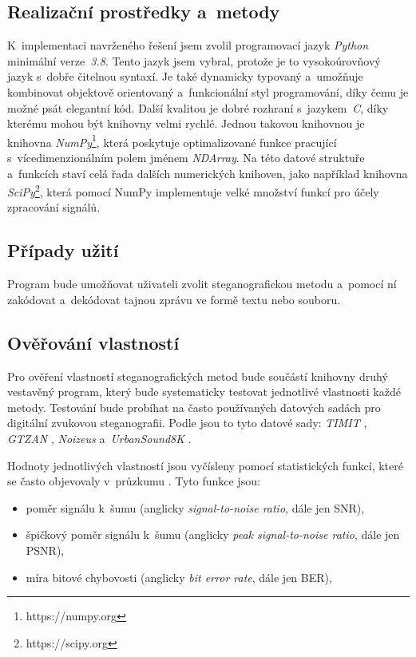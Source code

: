 \subsection*{Realizační prostředky a~metody}
\label{sub:solution-tool-choices}

K~implementaci navrženého řešení jsem zvolil programovací jazyk \textit{Python}
minimální verze~\textit{3.8}. Tento jazyk jsem vybral, protože je to
vysokoúrovňový jazyk s~dobře čitelnou syntaxí. Je také dynamicky typovaný
a~umožňuje kombinovat objektově orientovaný a~funkcionální styl programování,
díky čemu je možné psát elegantní kód. Další kvalitou je dobré rozhraní
s~jazykem~\textit{C}, díky kterému mohou být knihovny velmi rychlé. Jednou
takovou knihovnou je knihovna \textit{NumPy}\footnote{https://numpy.org}, která
poskytuje optimalizované funkce pracující s~vícedimenzionálním polem jménem
\textit{NDArray}. Na této datové struktuře a~funkcích staví celá řada dalších
numerických knihoven, jako například knihovna
\textit{SciPy}\footnote{https://scipy.org}, která pomocí NumPy implementuje
velké množství funkcí pro účely zpracování signálů.

\subsection*{Případy užití}
\label{sub:use-cases}

Program bude umožňovat uživateli zvolit steganografickou metodu a~pomocí ní
zakódovat a~dekódovat tajnou zprávu ve formě textu nebo souboru.

\subsection*{Ověřování vlastností}
\label{sub:method-property-verification}

Pro ověření vlastností steganografických metod bude součástí knihovny druhý
vestavěný program, který bude systematicky testovat jednotlivé vlastnosti každé
metody. Testování bude probíhat na často používaných datových sadách pro
digitální zvukovou steganografii. Podle \cite{AlSabhany2020} jsou to tyto
datové sady: \textit{TIMIT} \cite{Garofolo1993}, \textit{GTZAN}
\cite{Tzanetakis2001}, \textit{Noizeus} \cite{Hu2006} a~\textit{UrbanSound8K}
\cite{Salamon2014}.

Hodnoty jednotlivých vlastností jsou vyčísleny pomocí statistických funkcí,
které se často objevovaly v~průzkumu \cite{AlSabhany2020}. Tyto funkce jsou:

\begin{itemize}
    \item poměr signálu k~šumu (anglicky \textit{signal-to-noise ratio}, dále
        jen SNR),
    \item špičkový poměr signálu k~šumu (anglicky \textit{peak signal-to-noise
        ratio}, dále jen PSNR),
    \item míra bitové chybovosti (anglicky \textit{bit error rate}, dále jen
        BER),
\end{itemize}


